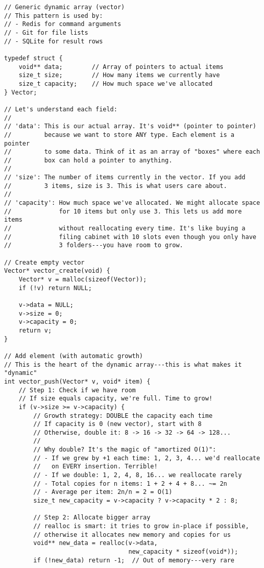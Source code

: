 \begin{lstlisting}
// Generic dynamic array (vector)
// This pattern is used by:
// - Redis for command arguments
// - Git for file lists
// - SQLite for result rows

typedef struct {
    void** data;        // Array of pointers to actual items
    size_t size;        // How many items we currently have
    size_t capacity;    // How much space we've allocated
} Vector;

// Let's understand each field:
//
// 'data': This is our actual array. It's void** (pointer to pointer)
//         because we want to store ANY type. Each element is a pointer
//         to some data. Think of it as an array of "boxes" where each
//         box can hold a pointer to anything.
//
// 'size': The number of items currently in the vector. If you add
//         3 items, size is 3. This is what users care about.
//
// 'capacity': How much space we've allocated. We might allocate space
//             for 10 items but only use 3. This lets us add more items
//             without reallocating every time. It's like buying a
//             filing cabinet with 10 slots even though you only have
//             3 folders---you have room to grow.

// Create empty vector
Vector* vector_create(void) {
    Vector* v = malloc(sizeof(Vector));
    if (!v) return NULL;

    v->data = NULL;
    v->size = 0;
    v->capacity = 0;
    return v;
}

// Add element (with automatic growth)
// This is the heart of the dynamic array---this is what makes it "dynamic"
int vector_push(Vector* v, void* item) {
    // Step 1: Check if we have room
    // If size equals capacity, we're full. Time to grow!
    if (v->size >= v->capacity) {
        // Growth strategy: DOUBLE the capacity each time
        // If capacity is 0 (new vector), start with 8
        // Otherwise, double it: 8 -> 16 -> 32 -> 64 -> 128...
        //
        // Why double? It's the magic of "amortized O(1)":
        // - If we grew by +1 each time: 1, 2, 3, 4... we'd reallocate
        //   on EVERY insertion. Terrible!
        // - If we double: 1, 2, 4, 8, 16... we reallocate rarely
        // - Total copies for n items: 1 + 2 + 4 + 8... ~= 2n
        // - Average per item: 2n/n = 2 = O(1)
        size_t new_capacity = v->capacity ? v->capacity * 2 : 8;

        // Step 2: Allocate bigger array
        // realloc is smart: it tries to grow in-place if possible,
        // otherwise it allocates new memory and copies for us
        void** new_data = realloc(v->data,
                                  new_capacity * sizeof(void*));
        if (!new_data) return -1;  // Out of memory---very rare


\end{lstlisting}
